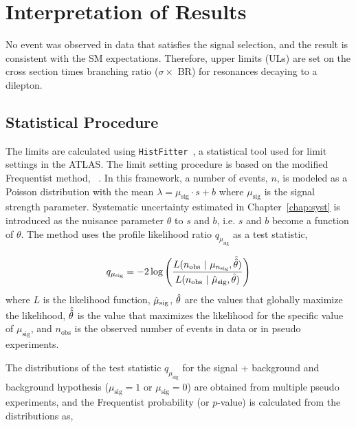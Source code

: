 \chapter{Interpretation of Results}
\label{chap:upper_limit}

No event was observed in data that satisfies the signal selection, and the result is consistent with the SM expectations. Therefore, upper limits (ULs) are set on the cross section times branching ratio ($\sigma \times$ BR) for resonances decaying to a dilepton.

\section{Statistical Procedure}
The limits are calculated using \texttt{HistFitter}~\cite{Baak:2014wma}, a statistical tool used for limit settings in the ATLAS. The limit setting procedure is based on the modified Frequentist method, \CLs~\cite{OBRAZTSOV1992388,PhysRevD.57.3873}. In this framework, a number of events, $n$, is modeled as a Poisson distribution with the mean $\lambda = \mu_{\mathrm{sig}}\cdot s + b$ where $\mu_{\mathrm{sig}}$ is the signal strength parameter. Systematic uncertainty estimated in Chapter~\ref{chap:syst} is introduced as the nuisance parameter $\theta$ to $s$ and $b$, i.e. $s$ and $b$ become a function of $\theta$. The method uses the profile likelihood ratio $q_{\mu_{\mathrm{sig}}}$ as a test statistic,

\begin{equation}
q_{\mu_{\mathrm{sig}}} = -2 \log \Bigg( \dfrac{L(n_\mathrm{obs}~|~\mu_{n_\mathrm{sig}}, \Hat{\Hat{\theta}})}{L(n_\mathrm{obs}~|~\Hat{\mu}_{\mathrm{sig}}, \Hat{\theta})}\Bigg)
\label{eq:test_statistic}
\end{equation}
%
where $L$ is the likelihood function, $\Hat{\mu}_{\mathrm{sig}}$, $\Hat{\theta}$ are the values that globally maximize the likelihood, $\Hat{\Hat{\theta}}$ is the value that maximizes the likelihood for the specific value of $\mu_{\mathrm{sig}}$, and $n_{\mathrm{obs}}$ is the observed number of events in data or in pseudo experiments.

The distributions of the test statistic $q_{\mu_{\mathrm{sig}}}$ for the signal + background and background hypothesis ($\mu_{\mathrm{sig}} = 1$ or $\mu_{\mathrm{sig}} = 0$) are obtained from multiple pseudo experiments, and the Frequentist probability (or $p$-value) is calculated from the distributions as,

